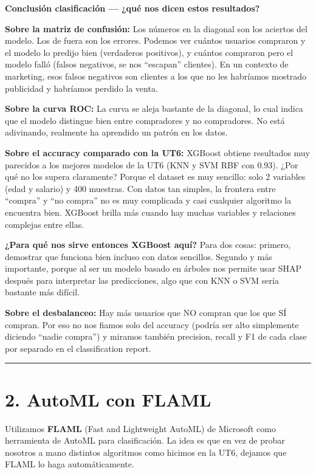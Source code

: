 \documentclass[11pt]{article}
\begin{document}
    \textbf{Conclusión clasificación --- ¿qué nos dicen estos resultados?}

\textbf{Sobre la matriz de confusión:} Los números en la diagonal son
los aciertos del modelo. Los de fuera son los errores. Podemos ver
cuántos usuarios compraron y el modelo lo predijo bien (verdaderos
positivos), y cuántos compraron pero el modelo falló (falsos negativos,
se nos ``escapan'' clientes). En un contexto de marketing, esos falsos
negativos son clientes a los que no les habríamos mostrado publicidad y
habríamos perdido la venta.

\textbf{Sobre la curva ROC:} La curva se aleja bastante de la diagonal,
lo cual indica que el modelo distingue bien entre compradores y no
compradores. No está adivinando, realmente ha aprendido un patrón en los
datos.

\textbf{Sobre el accuracy comparado con la UT6:} XGBoost obtiene
resultados muy parecidos a los mejores modelos de la UT6 (KNN y SVM RBF
con 0.93). ¿Por qué no los supera claramente? Porque el dataset es muy
sencillo: solo 2 variables (edad y salario) y 400 muestras. Con datos
tan simples, la frontera entre ``compra'' y ``no compra'' no es muy
complicada y casi cualquier algoritmo la encuentra bien. XGBoost brilla
más cuando hay muchas variables y relaciones complejas entre ellas.

\textbf{¿Para qué nos sirve entonces XGBoost aquí?} Para dos cosas:
primero, demostrar que funciona bien incluso con datos sencillos.
Segundo y más importante, porque al ser un modelo basado en árboles nos
permite usar SHAP después para interpretar las predicciones, algo que
con KNN o SVM sería bastante más difícil.

\textbf{Sobre el desbalanceo:} Hay más usuarios que NO compran que los
que SÍ compran. Por eso no nos fiamos solo del accuracy (podría ser alto
simplemente diciendo ``nadie compra'') y miramos también precision,
recall y F1 de cada clase por separado en el classification report.

    \begin{center}\rule{0.5\linewidth}{0.5pt}\end{center}

\section{2. AutoML con FLAML}\label{automl-con-flaml}

Utilizamos \textbf{FLAML} (Fast and Lightweight AutoML) de Microsoft
como herramienta de AutoML para clasificación. La idea es que en vez de
probar nosotros a mano distintos algoritmos como hicimos en la UT6,
dejamos que FLAML lo haga automáticamente.
\end{document}
